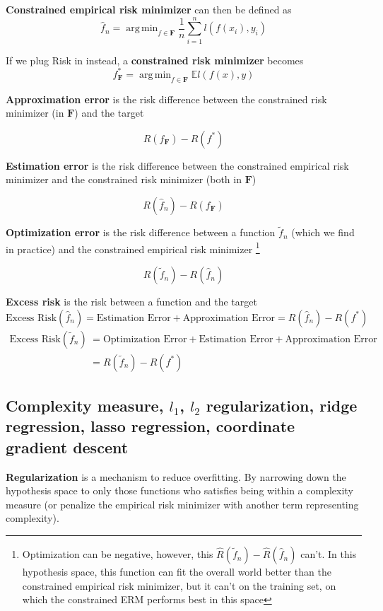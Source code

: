 \documentclass{article}
\DeclareMathOperator*{\argmin}{arg\,min}
\begin{document}
\textbf{Constrained empirical risk minimizer} can then be defined as
$$
\hat{f}_n = \argmin_{f \in \mathbf{F}}{\frac{1}{n} \sum_{i = 1}^{n}{\mathit{l}(f(x_i), y_i)}}
$$

If we plug Risk in instead, a \textbf{constrained risk minimizer} becomes
$$
f^*_{\mathbf{F}} = \argmin_{f \in \mathbf{F}}{\mathbb{E}\mathit{l}(f(x), y)}
$$

\textbf{Approximation error} is the risk difference between the constrained risk minimizer (in $\mathbf{F}$) and the target

$$
R(f_{\mathbf{F}}) - R(f^*)
$$

\textbf{Estimation error} is the risk difference between the constrained empirical risk minimizer and the constrained risk minimizer (both in $\mathbf{F}$)

$$
R(\hat{f}_n) - R(f_{\mathbf{F}})
$$

\textbf{Optimization error} is the risk difference between a function $\tilde{f}_n$ (which we find in practice) and the constrained empirical risk minimizer
\footnote{Optimization can be negative, however, this $\hat{R}(\tilde{f}_n) - \hat{R}(\hat{f}_n)$ can't.
In this hypothesis space, this function can fit the overall world better than the constrained empirical risk minimizer, but it can't on the training set, on which the constrained ERM performs best in this space}

$$
R(\tilde{f}_n) - R(\hat{f}_n)
$$

\textbf{Excess risk} is the risk between a function and the target
$$
\text{Excess Risk}(\hat{f}_n) = \text{Estimation Error} + \text{Approximation Error} = R(\hat{f}_n) - R(f^*)
$$
\begin{align*}
\text{Excess Risk}(\tilde{f}_n) &= \text{Optimization Error} + \text{Estimation Error} + \text{Approximation Error} \\
                                &= R(\tilde{f}_n) - R(f^*)
\end{align*}

\subsection{Complexity measure, $\mathit{l}_1$, $\mathit{l}_2$ regularization, ridge regression, lasso regression, coordinate gradient descent}

\textbf{Regularization} is a mechanism to reduce overfitting.
By narrowing down the hypothesis space to only those functions who satisfies being within a complexity measure (or penalize the empirical risk minimizer with another term representing complexity).
\end{document}
